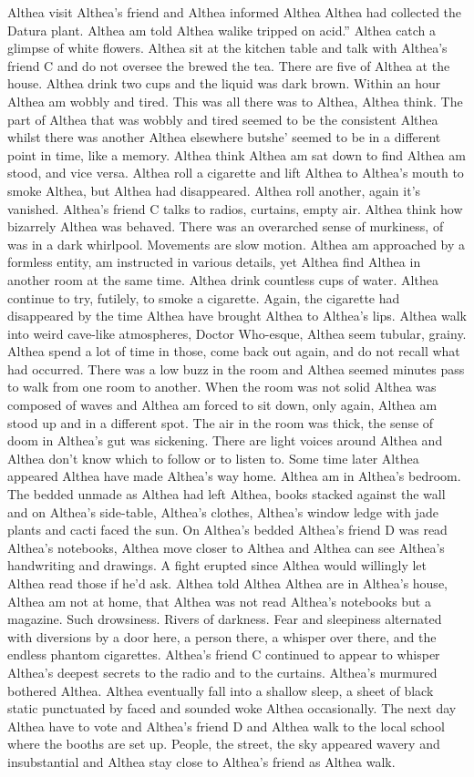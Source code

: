 \documentclass[12pt]{book}
\begin{document}
Althea visit Althea's friend and Althea informed Althea Althea had collected the Datura plant. Althea am told Althea walike tripped on acid.'' Althea catch a glimpse of white flowers. Althea sit at the kitchen table and talk with Althea's friend C and do not oversee the brewed the tea. There are five of Althea at the house. Althea drink two cups and the liquid was dark brown. Within an hour Althea am wobbly and tired. This was all there was to Althea, Althea think. The part of Althea that was wobbly and tired seemed to be the consistent Althea whilst there was another Althea elsewhere butshe' seemed to be in a different point in time, like a memory. Althea think Althea am sat down to find Althea am stood, and vice versa. Althea roll a cigarette and lift Althea to Althea's mouth to smoke Althea, but Althea had disappeared. Althea roll another, again it's vanished. Althea's friend C talks to radios, curtains, empty air. Althea think how bizarrely Althea was behaved. There was an overarched sense of murkiness, of was in a dark whirlpool. Movements are slow motion. Althea am approached by a formless entity, am instructed in various details, yet Althea find Althea in another room at the same time. Althea drink countless cups of water. Althea continue to try, futilely, to smoke a cigarette. Again, the cigarette had disappeared by the time Althea have brought Althea to Althea's lips. Althea walk into weird cave-like atmospheres, Doctor Who-esque, Althea seem tubular, grainy. Althea spend a lot of time in those, come back out again, and do not recall what had occurred. There was a low buzz in the room and Althea seemed minutes pass to walk from one room to another. When the room was not solid Althea was composed of waves and Althea am forced to sit down, only again, Althea am stood up and in a different spot. The air in the room was thick, the sense of doom in Althea's gut was sickening. There are light voices around Althea and Althea don't know which to follow or to listen to. Some time later Althea appeared Althea have made Althea's way home. Althea am in Althea's bedroom. The bedded unmade as Althea had left Althea, books stacked against the wall and on Althea's side-table, Althea's clothes, Althea's window ledge with jade plants and cacti faced the sun. On Althea's bedded Althea's friend D was read Althea's notebooks, Althea move closer to Althea and Althea can see Althea's handwriting and drawings. A fight erupted since Althea would willingly let Althea read those if he'd ask. Althea told Althea Althea are in Althea's house, Althea am not at home, that Althea was not read Althea's notebooks but a magazine. Such drowsiness. Rivers of darkness. Fear and sleepiness alternated with diversions by a door here, a person there, a whisper over there, and the endless phantom cigarettes. Althea's friend C continued to appear to whisper Althea's deepest secrets to the radio and to the curtains. Althea's murmured bothered Althea. Althea eventually fall into a shallow sleep, a sheet of black static punctuated by faced and sounded woke Althea occasionally. The next day Althea have to vote and Althea's friend D and Althea walk to the local school where the booths are set up. People, the street, the sky appeared wavery and insubstantial and Althea stay close to Althea's friend as Althea walk. 
\end{document}
